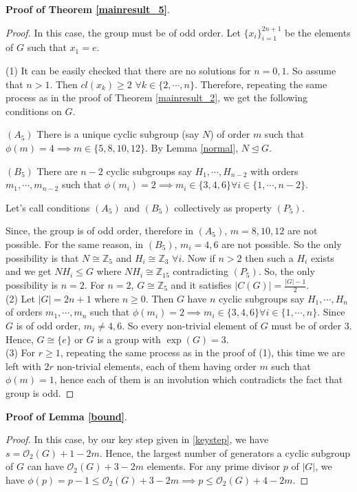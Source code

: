 \documentclass[a4paper,11pt]{amsart}
\numberwithin{equation}{section}
\numberwithin{equation}{subsection}
\begin{document}
\noindent \textbf{Proof of Theorem \ref{mainresult_5}}.
\begin{proof}
 In this case, the group must be of odd order. Let $\{x_i\}_{i=1}^{2n+1}$ be the elements of $G$ such that $x_1 =e$.
 
 (1)  It can be easily checked that there are no solutions for $n=0,1$. So assume that $n>1$. Then  $cl(x_k)\geq 2 $ $\forall k\in \{2,\cdots, n\}$. Therefore, repeating the same process as in the proof of Theorem \ref{mainresult_2}, we get the following conditions on $G$.


$(A_5)$ There is a unique cyclic subgroup (say $N$) of order $m$ such that $\phi(m) = 4 \implies m\in \{5,8,10,12\}$. By Lemma \ref{normal}, $N\trianglelefteq G$.

$(B_5)$ There are $n-2$ cyclic subgroups say $H_1,\cdots,H_{n-2}$ with orders $m_1,\cdots,m_{n-2}$ such that $\phi(m_i) = 2\implies m_i\in \{3,4,6\} \forall i\in \{1,\cdots,n-2\}$.

Let's call conditions $(A_5)$ and $(B_5)$ collectively as property $(P_5)$.

Since, the group is of odd order, therefore in $(A_5)$, $m=8, 10, 12$ are not possible. For the same reason, in $(B_5)$, $m_i = 4,6$ are not possible. So the only possibility is that $N\cong \mathbb Z_5$ and $H_i\cong \mathbb Z_3$ $\forall i$. Now if $n>2$ then such a $H_i$ exists and we get $NH_i\leq G$ where $NH_i\cong \mathbb Z_{15}$ contradicting $(P_5)$. So, the only possibility is $n= 2$. For $n=2$, $G\cong \mathbb Z_5$ and it satisfies $|C(G)| = \frac{|G|-1}{2}$.\\


(2) Let $|G| = 2n+1$ where $n\geq 0$. Then $G$ have $n$ cyclic subgroups say $H_1,\cdots,H_{n}$ of orders $m_1,\cdots,m_{n}$ such that $\phi(m_i) = 2\implies m_i\in \{3,4,6\} \forall i\in \{1,\cdots,n\}$.  Since $G$ is of odd order, $m_i\neq 4,6$. So every non-trivial element of $G$ must be of order $3$. Hence, $G\cong\{e\}$ or $G$ is a group with $\exp(G)=3$.\\

(3) For $r\geq 1$, repeating the same process as in the proof of (1), this time we are left with $2r$ non-trivial elements, each of them having order $m$ such that $\phi(m)=1$, hence each of them is an involution which contradicts the fact that group is odd.
\end{proof}


\noindent \textbf{Proof of Lemma \ref{bound}}.
\begin{proof}
In this case, by our key step given in \ref{keystep}, we have $s=\mathcal{O}_{2}(G)+1-2m$. Hence, the largest number of generators  a cyclic subgroup of $G$ can have $\mathcal{O}_2(G)+3-2m$ elements. For any prime divisor $p$ of  $|G|$, we have $\phi(p)=p-1 \leq \mathcal{O}_2(G)+3-2m\implies p\leq \mathcal{O}_2(G)+4-2m$. 
\end{proof}
\end{document}
